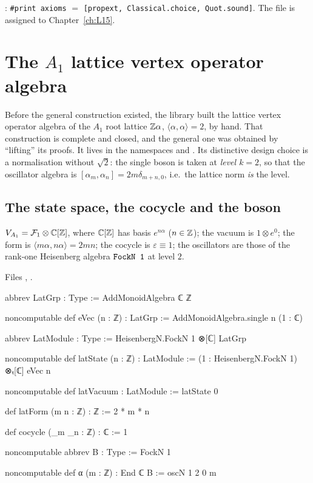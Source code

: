 \begin{status}
: \texttt{\#print axioms} $=$ \texttt{[propext, Classical.choice, Quot.sound]}. The file is
assigned to Chapter~\ref{ch:L15}.
\end{status}

\section{The \texorpdfstring{$A_1$}{A1} lattice vertex operator algebra}\label{l05:sec:A1}

Before the general construction existed, the library built the lattice vertex operator algebra of the $A_1$ root
lattice ${\mathbb{Z}}\alpha$, $\langle\alpha,\alpha\rangle=2$, by hand. That construction is complete and closed, and
the general one was obtained by ``lifting'' its proofs. It lives in the namespaces  and
. Its distinctive design choice is a normalisation without $\sqrt2$: the single boson is taken
at \emph{level $k=2$}, so that the oscillator algebra is $[\alpha_m,\alpha_n]=2m\delta_{m+n,0}$, i.e.\ the
lattice norm \emph{is} the level.

\subsection{The state space, the cocycle and the boson}

\begin{definition}\label{l05:def:A1space}
$V_{A_1}=\mathcal{F}_1\otimes{\mathbb{C}}[{\mathbb{Z}}]$, where ${\mathbb{C}}[{\mathbb{Z}}]$ has basis $e^{n\alpha}$ ($n\in{\mathbb{Z}}$); the vacuum is $1\otimes e^0$;
the form is $\langle m\alpha,n\alpha\rangle=2mn$; the cocycle is $\varepsilon\equiv1$; the oscillators are those of
the rank-one Heisenberg algebra $\lean{FockN 1}$ at level $2$.
\end{definition}

\noindent Files , .
\begin{leancode}
abbrev LatGrp : Type := AddMonoidAlgebra ℂ ℤ

noncomputable def eVec (n : ℤ) : LatGrp := AddMonoidAlgebra.single n (1 : ℂ)

abbrev LatModule : Type := HeisenbergN.FockN 1 ⊗[ℂ] LatGrp

noncomputable def latState (n : ℤ) : LatModule :=
  (1 : HeisenbergN.FockN 1) ⊗ₜ[ℂ] eVec n

noncomputable def latVacuum : LatModule := latState 0

def latForm (m n : ℤ) : ℤ := 2 * m * n

def cocycle (_m _n : ℤ) : ℂ := 1

noncomputable abbrev B : Type := FockN 1

noncomputable def α (m : ℤ) : End ℂ B := oscN 1 2 0 m
\end{leancode}

